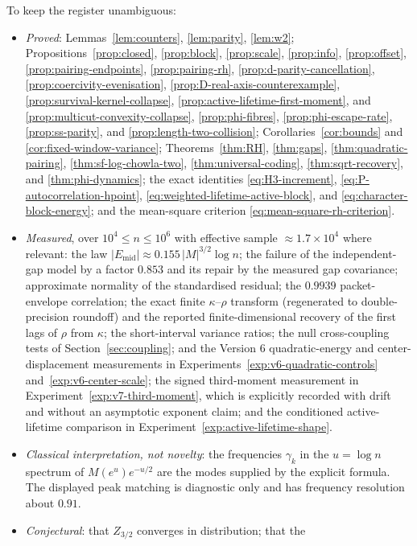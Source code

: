 \documentclass[11pt]{amsart}
\numberwithin{equation}{section}
\theoremstyle{plain}
\theoremstyle{definition}
\theoremstyle{remark}
\newcommand{\Mert}{M}
\begin{document}
To keep the register unambiguous:
\begin{itemize}[leftmargin=1.6em]
\item \emph{Proved}: Lemmas~\ref{lem:counters}, \ref{lem:parity}, \ref{lem:w2};
Propositions~\ref{prop:closed}, \ref{prop:block}, \ref{prop:scale},
\ref{prop:info}, \ref{prop:offset}, \ref{prop:pairing-endpoints},
\ref{prop:pairing-rh}, \ref{prop:d-parity-cancellation},
\ref{prop:coercivity-evenisation}, \ref{prop:D-real-axis-counterexample},
\ref{prop:survival-kernel-collapse}, \ref{prop:active-lifetime-first-moment},
and \ref{prop:multicut-convexity-collapse}, \ref{prop:phi-fibres},
\ref{prop:phi-escape-rate}, \ref{prop:ss-parity}, and
\ref{prop:length-two-collision}; Corollaries~\ref{cor:bounds} and
\ref{cor:fixed-window-variance}; Theorems~\ref{thm:RH}, \ref{thm:gaps},
\ref{thm:quadratic-pairing}, \ref{thm:sf-log-chowla-two},
\ref{thm:universal-coding}, \ref{thm:sqrt-recovery}, and
\ref{thm:phi-dynamics}; the exact
identities \eqref{eq:H3-increment}, \eqref{eq:P-autocorrelation-hpoint},
\eqref{eq:weighted-lifetime-active-block}, and
\eqref{eq:character-block-energy}; and the mean-square criterion
\eqref{eq:mean-square-rh-criterion}.
\item \emph{Measured}, over $10^{4}\le n\le10^{6}$ with effective sample
$\approx1.7\times10^{4}$ where relevant: the law
$|E_{\mathrm{mid}}|\approx0.155\,|\Mert|^{3/2}\log n$; the failure of the
independent-gap model by a factor $0.853$ and its repair by the measured gap
covariance; approximate normality of the standardised residual; the
$0.9939$ packet-envelope correlation; the exact finite $\kappa$--$\rho$ transform (regenerated to double-precision
roundoff) and the reported finite-dimensional recovery of the first lags of $\rho$
from $\kappa$; the short-interval variance ratios; the
null cross-coupling tests of Section~\ref{sec:coupling}; and the Version 6
quadratic-energy and center-displacement measurements in
Experiments~\ref{exp:v6-quadratic-controls} and~\ref{exp:v6-center-scale};
the signed third-moment measurement in Experiment~\ref{exp:v7-third-moment},
which is explicitly recorded with drift and without an asymptotic exponent claim;
and the conditioned active-lifetime comparison in
Experiment~\ref{exp:active-lifetime-shape}.
\item \emph{Classical interpretation, not novelty}: the frequencies $\gamma_k$
in the $u=\log n$ spectrum of $M(e^u)e^{-u/2}$ are the modes supplied by the
explicit formula. The displayed peak matching is diagnostic only and has
frequency resolution about $0.91$.
\item \emph{Conjectural}: that $Z_{3/2}$ converges in distribution; that the

\end{itemize}
\end{document}
